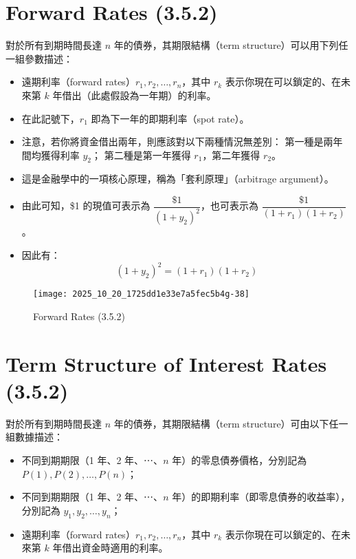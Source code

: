 \documentclass[letterpaper]{article}
\begin{document}
\section*{Forward Rates (3.5.2)}
對於所有到期時間長達 \( n \) 年的債券，其期限結構（term structure）可以用下列任一組參數描述：

\begin{itemize}
	\item 遠期利率（forward rates）\( r_{1}, r_{2}, \ldots, r_{n} \)，其中 \( r_{k} \) 表示你現在可以鎖定的、在未來第 \( k \) 年借出（此處假設為一年期）的利率。
	\item 在此記號下，\( r_{1} \) 即為下一年的即期利率（spot rate）。
	\item 注意，若你將資金借出兩年，則應該對以下兩種情況無差別：  
	第一種是兩年間均獲得利率 \( y_{2} \)；  
	第二種是第一年獲得 \( r_{1} \)，第二年獲得 \( r_{2} \)。
	\item 這是金融學中的一項核心原理，稱為「套利原理」（arbitrage argument）。
	\item 由此可知，\$1 的現值可表示為 \(\dfrac{\$1}{(1 + y_{2})^{2}}\)，也可表示為 \(\dfrac{\$1}{(1 + r_{1})(1 + r_{2})}\)。
	\item 因此有：
	\[
	(1 + y_{2})^{2} = (1 + r_{1})(1 + r_{2})
	\]
\end{itemize}


\begin{figure}[h]
\begin{center}
\caption{Forward Rates (3.5.2)}
  \texttt{[image: 2025\_10\_20\_1725dd1e33e7a5fec5b4g-38]}
\end{center}
\end{figure}

\section*{Term Structure of Interest Rates (3.5.2)}
對於所有到期時間長達 \( n \) 年的債券，其期限結構（term structure）可由以下任一組數據描述：

\begin{itemize}
	\item 不同到期期限（1 年、2 年、⋯、\( n \) 年）的零息債券價格，分別記為 \( P(1), P(2), \ldots, P(n) \)；
	\item 不同到期期限（1 年、2 年、⋯、\( n \) 年）的即期利率（即零息債券的收益率），分別記為 \( y_{1}, y_{2}, \ldots, y_{n} \)；
	\item 遠期利率（forward rates）\( r_{1}, r_{2}, \ldots, r_{n} \)，其中 \( r_{k} \) 表示你現在可以鎖定的、在未來第 \( k \) 年借出資金時適用的利率。
\end{itemize}
\end{document}
